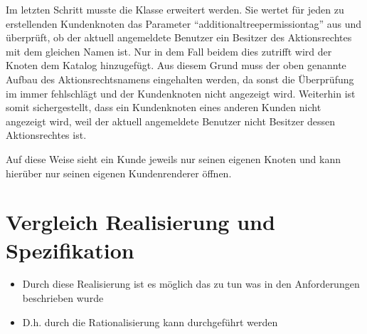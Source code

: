 Im letzten Schritt musste die Klasse  erweitert werden.
Sie wertet für jeden zu erstellenden Kundenknoten das Parameter "`additionaltreepermissiontag"' aus und überprüft, ob der aktuell angemeldete Benutzer ein Besitzer des Aktionsrechtes mit dem gleichen Namen ist.
Nur in dem Fall beidem dies zutrifft wird der Knoten dem Katalog hinzugefügt.
Aus diesem Grund muss der oben genannte Aufbau des Aktionsrechtsnamens eingehalten werden, da sonst die Überprüfung im   immer fehlschlägt und der Kundenknoten nicht angezeigt wird.
Weiterhin ist somit sichergestellt, dass ein Kundenknoten eines anderen Kunden nicht angezeigt wird, weil der aktuell angemeldete Benutzer nicht Besitzer dessen Aktionsrechtes ist.

Auf diese Weise sieht ein Kunde jeweils nur seinen eigenen Knoten und kann hierüber nur seinen eigenen Kundenrenderer öffnen. 



\section{Vergleich Realisierung und Spezifikation}
\begin{itemize}
	\item Durch diese Realisierung ist es möglich das zu tun was in den Anforderungen beschrieben wurde
	\item D.h. durch die Rationalisierung kann durchgeführt werden
\end{itemize}